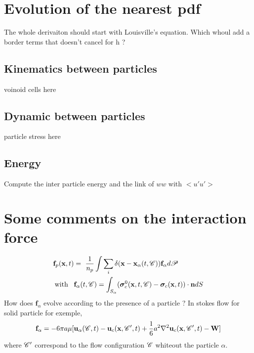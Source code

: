 \documentclass[12pt]{My_preprint}
\begin{document}
\section{Evolution of the nearest pdf}
The whole derivaiton should start with Louisville's equation. 
Which whoul add a border terms that doesn't cancel for h ? 










\subsection{Kinematics between particles}
voinoid cells here
\subsection{Dynamic between particles}
particle stress here
\subsection{Energy}
Compute the inter particle energy and the link of $ww$ with $<u'u'>$ 

\section{Some comments on the interaction force}
\begin{align}
    \textbf{f}_p (\textbf{x},t) &= \
    \frac{1}{n_p}\int \sum_i \delta(\textbf{x} - \textbf{x}_\alpha(t,\mathscr{C})) \textbf{f}_\alpha d\mathscr{P}\\
    \label{eq:f_alpha}
    \text{with} \;\;\; &\textbf{f}_\alpha(t,\mathscr{C}) = \int_{S_\alpha} (\bm{\sigma}_c^0(\textbf{x},t,\mathscr{C}) - \bm{\sigma}_c(\textbf{x},t) )\cdot \textbf{n} dS \\
\end{align}
How does $\textbf{f}_\alpha$ evolve according to the presence of a particle ? 
In stokes flow for solid particle for exemple, 
\begin{equation}
    \textbf{f}_\alpha
    = - 6 \pi a \mu [
        \textbf{u}_\alpha(\mathscr{C},t)
        - \textbf{u}_c(\textbf{x},\mathscr{C}',t)
        + \frac{1}{6}a^2 \mathbf{\nabla}^2\textbf{u}_c(\textbf{x},\mathscr{C}',t)
        - \textbf{W}
    ]
\end{equation}
where $\mathscr{C}'$ correspond to the flow configuration $\mathscr{C}$ whiteout the particle $\alpha$. 
\end{document}
